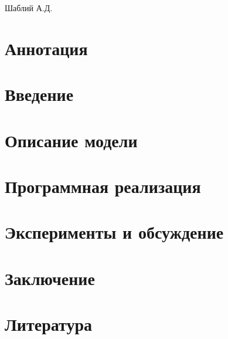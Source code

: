 \documentclass{article}
\begin{document}
    \begin{center}
    \Large
    \textbf{}
    \end{center}

    \begin{center}
        Шаблий А.Д.
    \end{center}

    \section*{Аннотация}
    

    \section*{Введение}
    

    \section*{Описание модели}
    

    \section*{Программная реализация}
    

    \section*{Эксперименты и обсуждение}
    

    \section*{Заключение}
    

    \section*{Литература}
    
\end{document}

